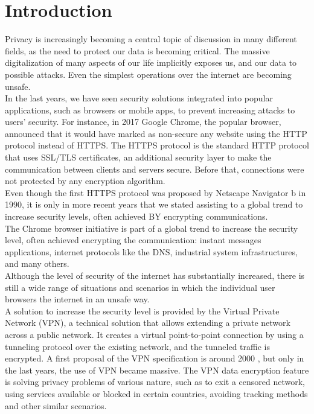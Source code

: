 \documentclass[12pt]{article}
\begin{document}
	\section{Introduction}
	Privacy is increasingly becoming a central topic of discussion in many different fields, as the need to protect our data is becoming critical. The massive digitalization of many aspects of our life implicitly exposes us, and our data to possible attacks. Even the simplest operations over the internet are becoming unsafe.\\
	In the last years, we have seen security solutions integrated into popular applications, such as browsers or mobile apps, to prevent increasing attacks to users' security. For instance, in 2017 Google Chrome, the popular browser, announced that it would have marked as non-secure any website using the HTTP protocol instead of HTTPS. The HTTPS protocol is the standard HTTP protocol that uses SSL/TLS certificates, an additional security layer to make the communication between clients and servers secure. Before that, connections were not protected by any encryption algorithm.\\
	Even though the first HTTPS protocol was proposed by Netscape Navigator b in 1990, it is only in more recent years that we stated assisting to a global trend to increase security levels, often achieved BY encrypting communications.\\
	The Chrome browser initiative is part of a global trend to increase the security level, often achieved encrypting the communication: instant messages applications, internet protocols like the DNS, industrial system infrastructures, and many others.\\
	Although the level of security of the internet has substantially increased, there is still a wide range of situations and scenarios in which the individual user browsers the internet in an unsafe way.\\
	A solution to increase the security level is provided by the Virtual Private Network (VPN), a technical solution that allows extending a private network across a public network. It creates a virtual point-to-point connection by using a tunneling protocol over the existing network, and the tunneled traffic is encrypted. A first proposal of the VPN specification is around 2000 \cite{VPNRFC}, but only in the last years, the use of VPN became massive. The VPN data encryption feature is solving privacy problems of various nature, such as to exit a censored network, using services available or blocked in certain countries, avoiding tracking methods and other similar scenarios.\\
\end{document}
